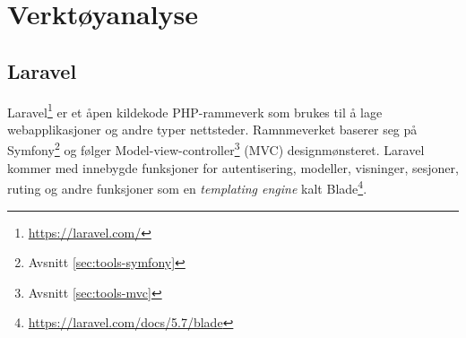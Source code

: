 \clearpage

\section{Verktøyanalyse}

\subsection{Laravel}
Laravel\footnote{\url{https://laravel.com/}} er et åpen kildekode PHP-rammeverk som brukes til å lage webapplikasjoner og andre typer nettsteder. Ramnmeverket baserer seg på Symfony\footnote{Avsnitt \ref{sec:tools-symfony}} og følger Model-view-controller\footnote{Avsnitt \ref{sec:tools-mvc}} (MVC) designmønsteret.
Laravel kommer med innebygde funksjoner for autentisering, modeller, visninger, sesjoner, ruting og andre funksjoner som en \textit{templating engine} kalt Blade\footnote{\url{https://laravel.com/docs/5.7/blade}}.




